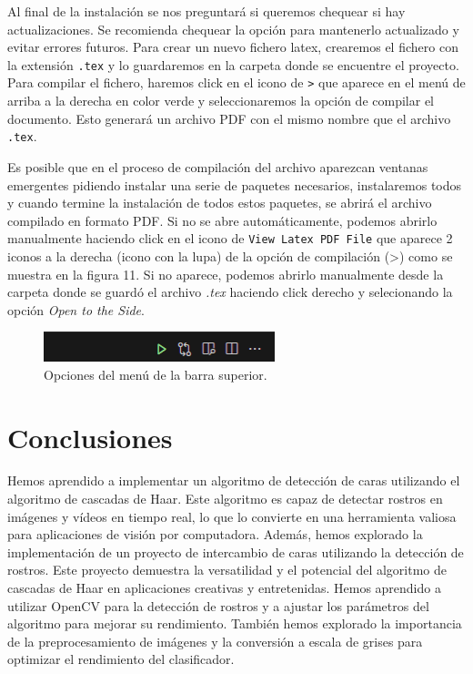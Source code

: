 \documentclass[a4paper]{article}
\begin{document}
Al final de la instalación se nos preguntará si queremos chequear si hay actualizaciones. Se recomienda chequear la opción para mantenerlo actualizado y evitar errores futuros.
Para crear un nuevo fichero latex, crearemos el fichero con la extensión \texttt{.tex} y lo guardaremos en la carpeta donde se encuentre el proyecto. Para compilar el fichero, haremos click en el icono de \texttt{>} que aparece en el menú de arriba a la derecha en color verde y seleccionaremos la opción de compilar el documento. Esto generará un archivo PDF con el mismo nombre que el archivo \texttt{.tex}.

Es posible que en el proceso de compilación del archivo aparezcan ventanas emergentes pidiendo instalar una serie de paquetes necesarios, instalaremos todos y cuando termine la instalación de todos estos paquetes, se abrirá el archivo compilado en formato PDF. Si no se abre automáticamente, podemos abrirlo manualmente haciendo click en el icono de \texttt{View Latex PDF File} que aparece 2 iconos a la derecha (icono con la lupa) de la opción de compilación (>) como se muestra en la figura 11. Si no aparece, podemos abrirlo manualmente desde la carpeta donde se guardó el archivo \textit{.tex} haciendo click derecho y selecionando la opción \textit{Open to the Side}.

\begin{figure}[h!]
    \centering
    \includegraphics[width=0.6\textwidth]{../img/menu.png}
    \caption{Opciones del menú de la barra superior.}
\end{figure}

\section{Conclusiones}

Hemos aprendido a implementar un algoritmo de detección de caras utilizando el algoritmo de cascadas de Haar. Este algoritmo es capaz de detectar rostros en imágenes y vídeos en tiempo real, lo que lo convierte en una herramienta valiosa para aplicaciones de visión por computadora.
Además, hemos explorado la implementación de un proyecto de intercambio de caras utilizando la detección de rostros. Este proyecto demuestra la versatilidad y el potencial del algoritmo de cascadas de Haar en aplicaciones creativas y entretenidas.
Hemos aprendido a utilizar OpenCV para la detección de rostros y a ajustar los parámetros del algoritmo para mejorar su rendimiento. También hemos explorado la importancia de la preprocesamiento de imágenes y la conversión a escala de grises para optimizar el rendimiento del clasificador.
\end{document}
